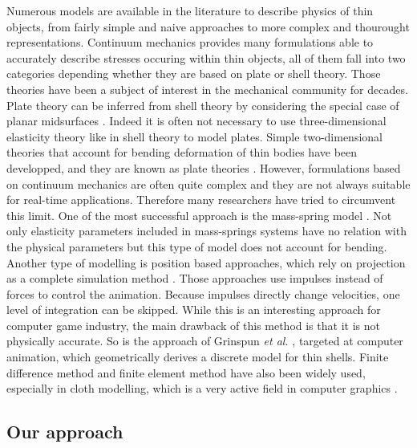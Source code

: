 \documentclass{llncs}
\begin{document}
Numerous models are available in the literature to describe physics of thin objects, from fairly simple and naive approaches to more complex and thourought representations. Continuum mechanics provides many formulations able to accurately describe stresses occuring within thin objects, all of them fall into two categories depending whether they are based on plate or shell theory. Those theories have been a subject of interest in the mechanical community for decades. Plate theory can be inferred from shell theory by considering the special case of planar midsurfaces \cite{Chapelle03}. Indeed it is often not necessary to use three-dimensional elasticity theory like in shell theory to model plates. Simple two-dimensional theories that account for bending deformation of thin bodies have been developped, and they are known as plate theories \cite{Reddy05}. However, formulations based on continuum mechanics are often quite complex and they are not always suitable for real-time applications. Therefore many researchers have tried to circumvent this limit. One of the most successful approach is the mass-spring model \cite{Provot95,Hammer08,Yu08}. Not only elasticity parameters included in mass-springs systems have no relation with the physical parameters but this type of model does not account for bending. Another type of modelling is position based approaches, which rely on projection as a complete simulation method \cite{Muller07}. Those approaches use impulses instead of forces to control the animation. Because impulses directly change velocities, one level of integration can be skipped. While this is an interesting approach for computer game industry, the main drawback of this method is that it is not physically accurate. So is the approach of Grinspun \emph{et al.} \cite{Grinspun03}, targeted at computer animation, which geometrically derives a discrete model for thin shells. Finite difference method \cite{Terzopoulos87} and finite element method have also been widely used, especially in cloth modelling, which is a very active field in computer graphics \cite{Volino00}. 

\subsection{Our approach}
\end{document}
